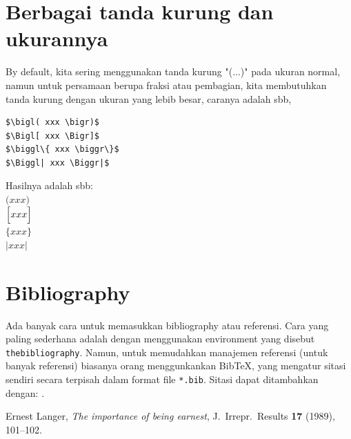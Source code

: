 \documentclass[12pt]{article}
\begin{document}
\section{Berbagai tanda kurung dan ukurannya}
By default, kita sering menggunakan tanda kurung "(...)" pada ukuran normal, namun untuk persamaan berupa fraksi atau pembagian, kita membutuhkan tanda kurung dengan ukuran yang lebib besar, caranya adalah sbb,
\begin{verbatim}
$\bigl( xxx \bigr)$
$\Bigl[ xxx \Bigr]$
$\biggl\{ xxx \biggr\}$
$\Biggl| xxx \Biggr|$
\end{verbatim}
Hasilnya adalah sbb:\\
$\bigl( xxx \bigr)$ \\
$\Bigl[ xxx \Bigr]$  \\
$\biggl\{ xxx \biggr\}$ \\
$\Biggl| xxx \Biggr|$ 

\section{Bibliography}
Ada banyak cara untuk memasukkan bibliography atau referensi. Cara yang paling sederhana adalah dengan menggunakan environment yang disebut \texttt{thebibliography}.  Namun, untuk memudahkan manajemen referensi (untuk banyak referensi) biasanya orang menggunkankan BibTeX, yang mengatur sitasi sendiri secara terpisah dalam format file \texttt{*.bib}.  Sitasi dapat ditambahkan dengan: \cite{langer1989}.

\begin{thebibliography}{9}

 Ernest Langer, \textit{The importance of being earnest}, J.\ Irrepr.\ Results \textbf{17} (1989), 101--102.

\end{thebibliography}
\end{document}
